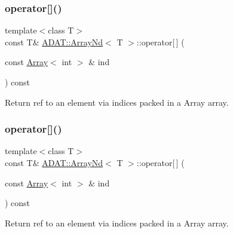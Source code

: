 \subsubsection{\texorpdfstring{operator[]()}{operator[]()}\hspace{0.1cm}{\footnotesize\ttfamily [4/6]}}
{\footnotesize\ttfamily template$<$class T$>$ \\
const T\& \mbox{\hyperlink{classADAT_1_1ArrayNd}{A\+D\+A\+T\+::\+Array\+Nd}}$<$ T $>$\+::operator\mbox{[}$\,$\mbox{]} (\begin{DoxyParamCaption}\item[{const \mbox{\hyperlink{classXMLArray_1_1Array}{Array}}$<$ int $>$ \&}]{ind }\end{DoxyParamCaption}) const\hspace{0.3cm}{\ttfamily [inline]}}



Return ref to an element via indices packed in a Array array. 

\mbox{\label{classADAT_1_1ArrayNd_a3b7160cbd3939f68f4a23df8cc56d2df}} 
\subsubsection{\texorpdfstring{operator[]()}{operator[]()}\hspace{0.1cm}{\footnotesize\ttfamily [5/6]}}
{\footnotesize\ttfamily template$<$class T$>$ \\
const T\& \mbox{\hyperlink{classADAT_1_1ArrayNd}{A\+D\+A\+T\+::\+Array\+Nd}}$<$ T $>$\+::operator\mbox{[}$\,$\mbox{]} (\begin{DoxyParamCaption}\item[{const \mbox{\hyperlink{classXMLArray_1_1Array}{Array}}$<$ int $>$ \&}]{ind }\end{DoxyParamCaption}) const\hspace{0.3cm}{\ttfamily [inline]}}



Return ref to an element via indices packed in a Array array. 

\mbox{\label{classADAT_1_1ArrayNd_a3b7160cbd3939f68f4a23df8cc56d2df}} 
